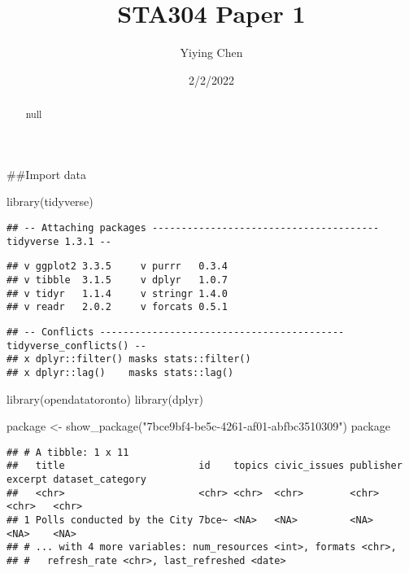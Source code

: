 \documentclass[
]{article}
\title{STA304 Paper 1}
\author{Yiying Chen}
\date{2/2/2022}
\newenvironment{Shaded}{\begin{snugshade}}{\end{snugshade}}
\newcommand{\FunctionTok}[1]{\textcolor[rgb]{0.00,0.00,0.00}{#1}}
\newcommand{\NormalTok}[1]{#1}
\newcommand{\OtherTok}[1]{\textcolor[rgb]{0.56,0.35,0.01}{#1}}
\newcommand{\StringTok}[1]{\textcolor[rgb]{0.31,0.60,0.02}{#1}}
\begin{document}
\maketitle
\begin{abstract}
null
\end{abstract}

\#\#Import data

\begin{Shaded}
\begin{Highlighting}[]
\FunctionTok{library}\NormalTok{(tidyverse)}
\end{Highlighting}
\end{Shaded}

\begin{verbatim}
## -- Attaching packages --------------------------------------- tidyverse 1.3.1 --
\end{verbatim}

\begin{verbatim}
## v ggplot2 3.3.5     v purrr   0.3.4
## v tibble  3.1.5     v dplyr   1.0.7
## v tidyr   1.1.4     v stringr 1.4.0
## v readr   2.0.2     v forcats 0.5.1
\end{verbatim}

\begin{verbatim}
## -- Conflicts ------------------------------------------ tidyverse_conflicts() --
## x dplyr::filter() masks stats::filter()
## x dplyr::lag()    masks stats::lag()
\end{verbatim}

\begin{Shaded}
\begin{Highlighting}[]
\FunctionTok{library}\NormalTok{(opendatatoronto)}
\FunctionTok{library}\NormalTok{(dplyr)}
 
\NormalTok{package }\OtherTok{\textless{}{-}} \FunctionTok{show\_package}\NormalTok{(}\StringTok{"7bce9bf4{-}be5c{-}4261{-}af01{-}abfbc3510309"}\NormalTok{)}
\NormalTok{package}
\end{Highlighting}
\end{Shaded}

\begin{verbatim}
## # A tibble: 1 x 11
##   title                       id    topics civic_issues publisher excerpt dataset_category
##   <chr>                       <chr> <chr>  <chr>        <chr>     <chr>   <chr>           
## 1 Polls conducted by the City 7bce~ <NA>   <NA>         <NA>      <NA>    <NA>            
## # ... with 4 more variables: num_resources <int>, formats <chr>,
## #   refresh_rate <chr>, last_refreshed <date>
\end{verbatim}
\end{document}
